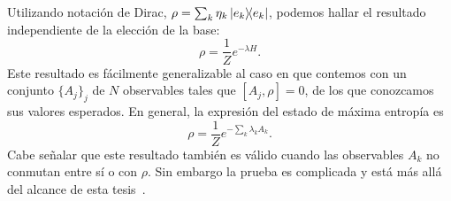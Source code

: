 Utilizando notación de Dirac, $\rho=\sum_{k}\eta_{k}\dyad{e_{k}}$, podemos hallar el resultado independiente de la elección de la base:
\begin{equation}
    \rho=\frac{1}{Z}e^{-\lambda H}.
\end{equation}
Este resultado es fácilmente generalizable al caso en que contemos con un  conjunto $\{A_{j}\}_{j}$ de $N$ observables tales que $[A_{j},\rho]=0$, de los que conozcamos sus valores esperados. En general, la expresión del estado de máxima entropía es
\begin{equation}\label{eq:GeneralMaxEnt}
    \rho=\frac{1}{Z}e^{-\sum_{k}\lambda_{k} A_{k}}.
\end{equation}
Cabe señalar que este resultado también es válido cuando las observables $A_k$ no conmutan entre sí o con $\rho$. Sin embargo la prueba es complicada y está más allá del alcance de esta tesis~\cite{FormalJaynes,Wichmann1963}.